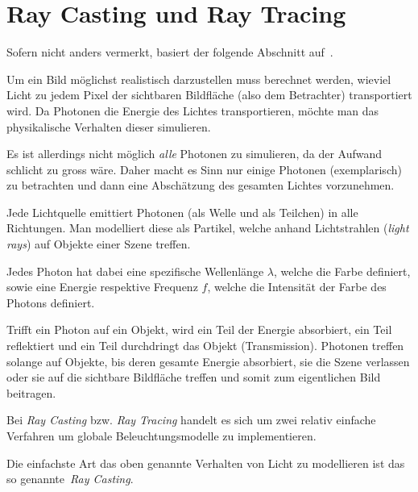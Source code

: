\section{Ray Casting und Ray Tracing}
\label{sec:ray_casting_tracing}

Sofern nicht anders vermerkt, basiert der folgende Abschnitt
auf~\cite[Kapitel 15, S. 387ff]{hughes_computer_2013}.

Um ein Bild möglichst realistisch darzustellen muss berechnet werden, wieviel
Licht zu jedem Pixel der sichtbaren Bildfläche (also dem Betrachter)
transportiert wird. Da Photonen die Energie des Lichtes transportieren,
möchte man das physikalische Verhalten dieser simulieren.

Es ist allerdings nicht möglich \textit{alle} Photonen zu simulieren, da
der Aufwand schlicht zu gross wäre. Daher macht es Sinn nur einige
Photonen (exemplarisch) zu betrachten und dann eine Abschätzung des
gesamten Lichtes vorzunehmen.

Jede Lichtquelle emittiert Photonen (als Welle und als Teilchen) in alle
Richtungen. Man modelliert diese als Partikel, welche anhand
Lichtstrahlen (\textit{light rays}) auf Objekte einer
Szene treffen.

Jedes Photon hat dabei eine spezifische Wellenlänge $\lambda{}$, welche
die Farbe definiert, sowie eine Energie respektive Frequenz $f$, welche
die Intensität der Farbe des Photons definiert.

Trifft ein Photon auf ein Objekt, wird ein Teil der Energie absorbiert,
ein Teil reflektiert und ein Teil durchdringt das Objekt (Transmission).
Photonen treffen solange auf Objekte, bis deren gesamte Energie
absorbiert, sie die Szene verlassen oder sie auf die sichtbare
Bildfläche treffen und somit zum eigentlichen Bild beitragen.

Bei \textit{Ray Casting} bzw. \textit{Ray Tracing} handelt es sich um
zwei relativ einfache Verfahren um globale Beleuchtungsmodelle zu
implementieren.

Die einfachste Art das oben genannte Verhalten von Licht zu modellieren
ist das so genannte~\textit{Ray Casting}.



